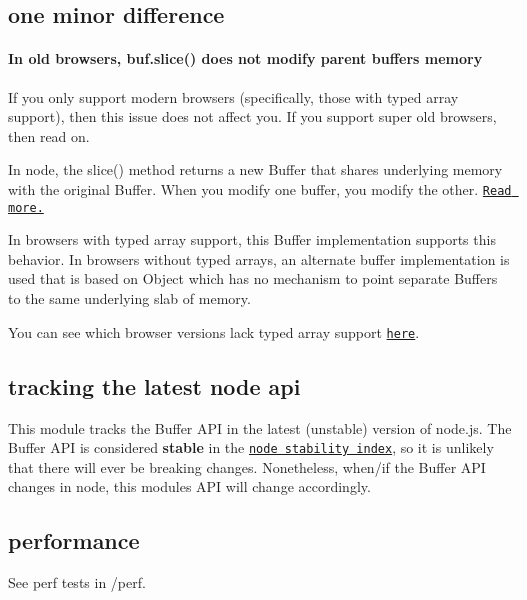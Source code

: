 \subsection*{one minor difference}

\paragraph*{In old browsers, {\ttfamily buf.\+slice()} does not modify parent buffer\textquotesingle{}s memory}

If you only support modern browsers (specifically, those with typed array support), then this issue does not affect you. If you support super old browsers, then read on.

In node, the {\ttfamily slice()} method returns a new {\ttfamily Buffer} that shares underlying memory with the original Buffer. When you modify one buffer, you modify the other. \href{http://iojs.org/api/buffer.html#buffer_buf_slice_start_end}{\tt Read more.}

In browsers with typed array support, this {\ttfamily Buffer} implementation supports this behavior. In browsers without typed arrays, an alternate buffer implementation is used that is based on {\ttfamily Object} which has no mechanism to point separate {\ttfamily Buffer}s to the same underlying slab of memory.

You can see which browser versions lack typed array support \href{https://github.com/feross/buffer/blob/master/index.js#L20-L46}{\tt here}.

\subsection*{tracking the latest node api}

This module tracks the Buffer A\+PI in the latest (unstable) version of node.\+js. The Buffer A\+PI is considered {\bfseries stable} in the \href{http://nodejs.org/docs/latest/api/documentation.html#documentation_stability_index}{\tt node stability index}, so it is unlikely that there will ever be breaking changes. Nonetheless, when/if the Buffer A\+PI changes in node, this module\textquotesingle{}s A\+PI will change accordingly.

\subsection*{performance}

See perf tests in {\ttfamily /perf}.


